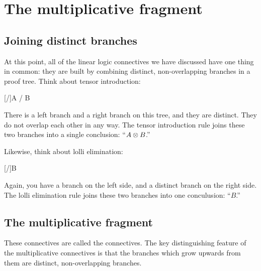 \documentclass[../../../main.tex]{subfiles}
\begin{document}
\chapter{The multiplicative fragment}


\section{Joining distinct branches}

At this point, all of the linear logic connectives we have discussed have one thing in common: they are built by combining distinct, non-overlapping branches in a proof tree. Think about tensor introduction:

\begin{prooftree*}
  \ellipsis{}{}
  \ellipsis{}{}
  [\tensorIntro/]{A \tensor/ B}
\end{prooftree*}

\noindent
There is a left branch and a right branch on this tree, and they are distinct. They do not overlap each other in any way. The tensor introduction rule joins these two branches into a single conclusion: ``$A \tensor/ B$.''

Likewise, think about lolli elimination: 

\begin{prooftree*}
  \ellipsis{}{}
  \ellipsis{}{}
  [\lolliElim/]{B}
\end{prooftree*}

\noindent
Again, you have a branch on the left side, and a distinct branch on the right side. The lolli elimination rule joins these two branches into one conculusion: ``$B$.''


\section{The multiplicative fragment}

These connectives are called the  connectives. The key distinguishing feature of the multiplicative connectives is that the branches which grow upwards from them are distinct, non-overlapping branches.
\end{document}
